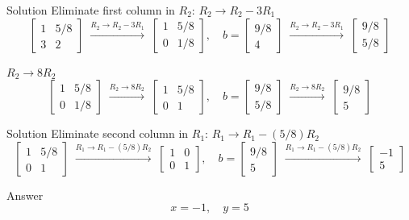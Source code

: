 \documentclass{beamer}
\begin{document}
\begin{frame}{Solution}
Eliminate first column in \(R_2\): \(R_2 \to R_2 - 3R_1\)
\[
\begin{bmatrix} 1 & 5/8 \\ 3 & 2 \end{bmatrix} 
\;\overset{R_2 \to R_2 - 3R_1}{\longrightarrow}\;
\begin{bmatrix} 1 & 5/8 \\ 0 & 1/8 \end{bmatrix}, \quad
b = \begin{bmatrix} 9/8 \\ 4 \end{bmatrix} 
\;\overset{R_2 \to R_2 - 3R_1}{\longrightarrow}\;
\begin{bmatrix} 9/8 \\ 5/8 \end{bmatrix}
\]

\(R_2 \to 8R_2\)
\[
\begin{bmatrix} 1 & 5/8 \\ 0 & 1/8 \end{bmatrix} 
\;\overset{R_2 \to 8R_2}{\longrightarrow}\;
\begin{bmatrix} 1 & 5/8 \\ 0 & 1 \end{bmatrix}, \quad
b = \begin{bmatrix} 9/8 \\ 5/8 \end{bmatrix} 
\;\overset{R_2 \to 8R_2}{\longrightarrow}\;
\begin{bmatrix} 9/8 \\ 5 \end{bmatrix}
\]
\end{frame}

\begin{frame}{Solution}
Eliminate second column in \(R_1\): \(R_1 \to R_1 - (5/8)R_2\)
\[
\begin{bmatrix} 1 & 5/8 \\ 0 & 1 \end{bmatrix} 
\;\overset{R_1 \to R_1 - (5/8)R_2}{\longrightarrow}\;
\begin{bmatrix} 1 & 0 \\ 0 & 1 \end{bmatrix}, \quad
b = \begin{bmatrix} 9/8 \\ 5 \end{bmatrix} 
\;\overset{R_1 \to R_1 - (5/8)R_2}{\longrightarrow}\;
\begin{bmatrix} -1 \\ 5 \end{bmatrix}
\]

 Answer 
\[
x = -1, \quad y = 5
\]
\end{frame}
\end{document}
